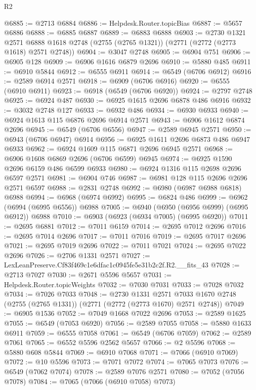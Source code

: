 \begin{lexlean}{R2}
\begin{coremodule}
@6885 := @2713 @6884
@6886 := Helpdesk.Router.topicBias
@6887 := @5657 @6886
@6888 := @6885 @6887
@6889 := @6883 @6888
@6903 := @2730
    @1321
    @2571
    @6888
    @1618
    @2748
    (@2755 (@2765 @1321))
    (@2771 (@2772 (@2773 @1618) @2571 @2748))
@6904 := @3047 @2748
@6905 := @6904 @751
@6906 := @6905 @128
@6909 := @6906 @1616 @6879 @2696
@6910 := @5880 @485
@6911 := @6910 @5844
@6912 := @6555 @6911
@6914 := @6549 (@6706 @6912)
@6916 := @2589 @6914 @2571
@6918 := @6909 (@6706 @6916)
@6920 := @6555 (@6910 @6911)
@6923 := @6918 (@6549 (@6706 @6920))
@6924 := @2797 @2748
@6925 := @6924 @487
@6930 := @6925 @1615 @2696 @6878 @486 @6916
@6932 := @3032 @2748 @127
@6933 := @6932 @486
@6934 := @6930 @6933
@6940 := @6924 @1613 @115 @6876 @2696 @6914 @2571
@6943 := @6906 @1612 @6874 @2696
@6945 := @6549 (@6706 @6556)
@6947 := @2589 @6945 @2571
@6950 := @6943 (@6706 @6947) @6914
@6956 := @6925 @1611 @2696 @6873 @486 @6947 @6933
@6962 := @6924 @1609 @115 @6871 @2696 @6945 @2571
@6968 := @6906 @1608 @6869 @2696 (@6706 @6599) @6945
@6974 := @6925 @1590 @2696 @6159 @486 @6599 @6933
@6980 := @6924 @1316 @115 @2698 @2696 @6597 @2571
@6981 := @6904 @746
@6987 := @6981 @128 @115 @2696 @2696 @2571 @6597
@6988 := @2831 @2748
@6992 := @6980 (@6987 @6988 @6818) @6988
@6994 := @6968 (@6974 @6992)
@6995 := @6824 @486
@6999 := @6962 (@6994 (@6995 @6556)) @6988
@7005 := @6940 (@6950 (@6956 @6999) (@6995 @6912)) @6988
@7010 := @6903 (@6923 (@6934 @7005) (@6995 @6920))
@7011 := @2695 @6881
@7012 := @7011 @6159
@7014 := @2695 @7012 @2696
@7016 := @2695 @7014 @2696
@7017 := @7011 @7016
@7019 := @2695 @7017 @2696
@7021 := @2695 @7019 @2696
@7022 := @7011 @7021
@7024 := @2695 @7022 @2696
@7026 := @2706 @1331 @2571
@7027 := LexLeanPreserve.Cf83f469c1e6dfac1c0945fe5e31b2c2f.R2.__fits_43
@7028 := @2713 @7027
@7030 := @2671 @5596 @5657
@7031 := Helpdesk.Router.topicWeights
@7032 := @7030 @7031
@7033 := @7028 @7032
@7034 := @7026 @7033
@7048 := @2730
    @1331
    @2571
    @7033
    @1670
    @2748
    (@2755 (@2765 @1331))
    (@2771 (@2772 (@2773 @1670) @2571 @2748))
@7049 := @6905 @1536
@7052 := @7049 @1668 @7022 @2696
@7053 := @2589 @1625
@7055 := @6549 (@7053 @6920)
@7056 := @2589 @7055
@7058 := @5880 @1633 @6911
@7059 := @6555 @7058
@7061 := @6549 (@6706 @7059)
@7062 := @2589 @7061
@7065 := @6552 @5596 @2562 @5657
@7066 := @2 @5596
@7068 := @5880 @608 @5844
@7069 := @6910 @7068
@7071 := @7066 (@6910 @7069)
@7072 := @10 @5596
@7073 := @7071 @7072
@7074 := @7065 @7073
@7076 := @6549 (@7062 @7074)
@7078 := @2589 @7076 @2571
@7080 := @7052 (@7056 @7078)
@7084 := @7065 (@7066 (@6910 @7058) @7073)

\end{coremodule}
\end{lexlean}
